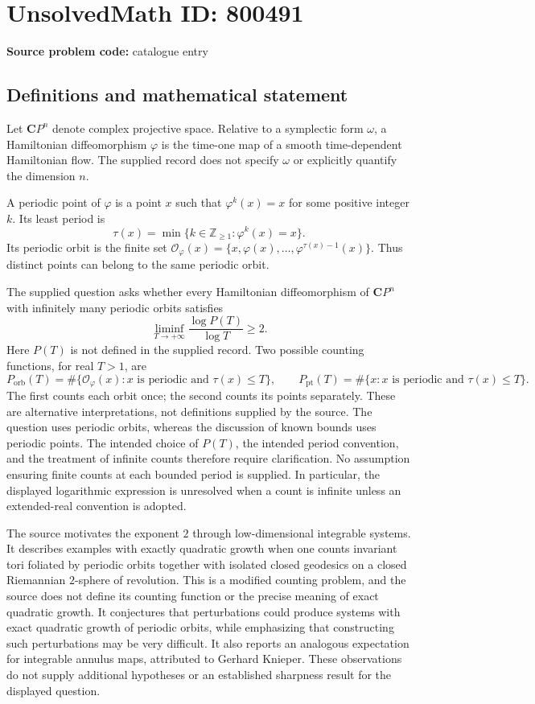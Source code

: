 \documentclass[11pt]{article}
\begin{document}
\section*{UnsolvedMath ID: 800491}
\textbf{Source problem code:} catalogue entry
\subsection{Definitions and mathematical statement}
Let \(\mathbf{C}P^n\) denote complex projective space. Relative to a symplectic form \(\omega\), a Hamiltonian diffeomorphism \(\varphi\) is the time-one map of a smooth time-dependent Hamiltonian flow. The supplied record does not specify \(\omega\) or explicitly quantify the dimension \(n\).

A periodic point of \(\varphi\) is a point \(x\) such that \(\varphi^k(x)=x\) for some positive integer \(k\). Its least period is
\[
\tau(x)=\min\{k\in\mathbb{Z}_{\geq 1}:\varphi^k(x)=x\}.
\]
Its periodic orbit is the finite set \(\mathcal O_\varphi(x)=\{x,\varphi(x),\ldots,\varphi^{\tau(x)-1}(x)\}\). Thus distinct points can belong to the same periodic orbit.

The supplied question asks whether every Hamiltonian diffeomorphism of \(\mathbf{C}P^n\) with infinitely many periodic orbits satisfies
\[
\liminf_{T\to+\infty}\frac{\log P(T)}{\log T}\geq 2.
\]
Here \(P(T)\) is not defined in the supplied record. Two possible counting functions, for real \(T>1\), are
\[
P_{\mathrm{orb}}(T)=\#\{\mathcal O_\varphi(x):x\text{ is periodic and }\tau(x)\leq T\},
\qquad
P_{\mathrm{pt}}(T)=\#\{x:x\text{ is periodic and }\tau(x)\leq T\}.
\]
The first counts each orbit once; the second counts its points separately. These are alternative interpretations, not definitions supplied by the source. The question uses periodic orbits, whereas the discussion of known bounds uses periodic points. The intended choice of \(P(T)\), the intended period convention, and the treatment of infinite counts therefore require clarification. No assumption ensuring finite counts at each bounded period is supplied. In particular, the displayed logarithmic expression is unresolved when a count is infinite unless an extended-real convention is adopted.

The source motivates the exponent \(2\) through low-dimensional integrable systems. It describes examples with exactly quadratic growth when one counts invariant tori foliated by periodic orbits together with isolated closed geodesics on a closed Riemannian \(2\)-sphere of revolution. This is a modified counting problem, and the source does not define its counting function or the precise meaning of exact quadratic growth. It conjectures that perturbations could produce systems with exact quadratic growth of periodic orbits, while emphasizing that constructing such perturbations may be very difficult. It also reports an analogous expectation for integrable annulus maps, attributed to Gerhard Knieper. These observations do not supply additional hypotheses or an established sharpness result for the displayed question.
\end{document}

